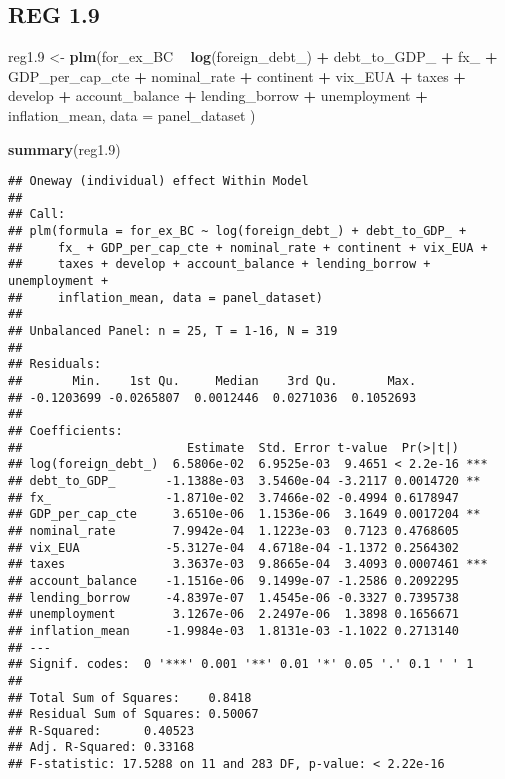 \documentclass[]{article}
\newenvironment{Shaded}{\begin{snugshade}}{\end{snugshade}}
\newcommand{\KeywordTok}[1]{\textcolor[rgb]{0.13,0.29,0.53}{\textbf{#1}}}
\newcommand{\DataTypeTok}[1]{\textcolor[rgb]{0.13,0.29,0.53}{#1}}
\newcommand{\DecValTok}[1]{\textcolor[rgb]{0.00,0.00,0.81}{#1}}
\newcommand{\StringTok}[1]{\textcolor[rgb]{0.31,0.60,0.02}{#1}}
\newcommand{\OperatorTok}[1]{\textcolor[rgb]{0.81,0.36,0.00}{\textbf{#1}}}
\newcommand{\NormalTok}[1]{#1}
\begin{document}
\subsection{REG 1.9}\label{reg-1.9}

\begin{Shaded}
\begin{Highlighting}[]
\NormalTok{reg1.}\DecValTok{9}\NormalTok{ <-}\StringTok{ }\KeywordTok{plm}\NormalTok{(for_ex_BC }\OperatorTok{~}\StringTok{  }\KeywordTok{log}\NormalTok{(foreign_debt_) }\OperatorTok{+}\StringTok{ }\NormalTok{debt_to_GDP_ }\OperatorTok{+}\StringTok{ }\NormalTok{fx_ }\OperatorTok{+}\StringTok{ }\NormalTok{GDP_per_cap_cte }\OperatorTok{+}\StringTok{ }\NormalTok{nominal_rate }\OperatorTok{+}\StringTok{ }\NormalTok{continent }\OperatorTok{+}\StringTok{ }\NormalTok{vix_EUA }\OperatorTok{+}\StringTok{ }\NormalTok{taxes }\OperatorTok{+}\StringTok{ }\NormalTok{develop }\OperatorTok{+}\StringTok{ }\NormalTok{account_balance }\OperatorTok{+}\StringTok{ }\NormalTok{lending_borrow }\OperatorTok{+}\StringTok{ }\NormalTok{unemployment }\OperatorTok{+}\StringTok{ }\NormalTok{inflation_mean, }\DataTypeTok{data =}\NormalTok{ panel_dataset )}

\KeywordTok{summary}\NormalTok{(reg1.}\DecValTok{9}\NormalTok{)}
\end{Highlighting}
\end{Shaded}

\begin{verbatim}
## Oneway (individual) effect Within Model
## 
## Call:
## plm(formula = for_ex_BC ~ log(foreign_debt_) + debt_to_GDP_ + 
##     fx_ + GDP_per_cap_cte + nominal_rate + continent + vix_EUA + 
##     taxes + develop + account_balance + lending_borrow + unemployment + 
##     inflation_mean, data = panel_dataset)
## 
## Unbalanced Panel: n = 25, T = 1-16, N = 319
## 
## Residuals:
##       Min.    1st Qu.     Median    3rd Qu.       Max. 
## -0.1203699 -0.0265807  0.0012446  0.0271036  0.1052693 
## 
## Coefficients:
##                       Estimate  Std. Error t-value  Pr(>|t|)    
## log(foreign_debt_)  6.5806e-02  6.9525e-03  9.4651 < 2.2e-16 ***
## debt_to_GDP_       -1.1388e-03  3.5460e-04 -3.2117 0.0014720 ** 
## fx_                -1.8710e-02  3.7466e-02 -0.4994 0.6178947    
## GDP_per_cap_cte     3.6510e-06  1.1536e-06  3.1649 0.0017204 ** 
## nominal_rate        7.9942e-04  1.1223e-03  0.7123 0.4768605    
## vix_EUA            -5.3127e-04  4.6718e-04 -1.1372 0.2564302    
## taxes               3.3637e-03  9.8665e-04  3.4093 0.0007461 ***
## account_balance    -1.1516e-06  9.1499e-07 -1.2586 0.2092295    
## lending_borrow     -4.8397e-07  1.4545e-06 -0.3327 0.7395738    
## unemployment        3.1267e-06  2.2497e-06  1.3898 0.1656671    
## inflation_mean     -1.9984e-03  1.8131e-03 -1.1022 0.2713140    
## ---
## Signif. codes:  0 '***' 0.001 '**' 0.01 '*' 0.05 '.' 0.1 ' ' 1
## 
## Total Sum of Squares:    0.8418
## Residual Sum of Squares: 0.50067
## R-Squared:      0.40523
## Adj. R-Squared: 0.33168
## F-statistic: 17.5288 on 11 and 283 DF, p-value: < 2.22e-16
\end{verbatim}
\end{document}
